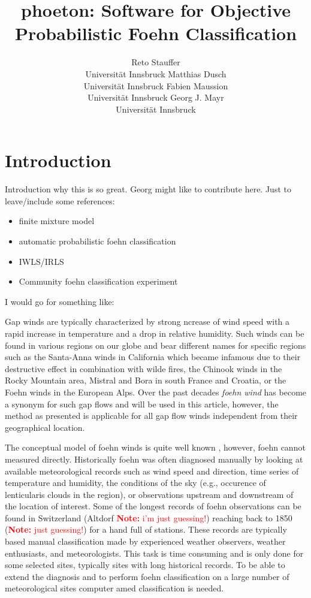 \documentclass[article,nojss,shortnames]{jss}
\author{Reto Stauffer\\Universit\"at Innsbruck
\And Matthias Dusch\\Universit\"at Innsbruck
\AND Fabien Maussion\\Universit\"at Innsbruck
\And Georg J. Mayr\\Universit\"at Innsbruck}
\title{phoeton: Software for Objective Probabilistic Foehn Classification}
\newcommand{\note}[1]{\textcolor{red}{\textbf{Note:} #1}}
\begin{document}
\section{Introduction}

Introduction why this is so great. Georg might like to contribute
here. Just to leave/include some references:
\begin{itemize}
    \item finite mixture model \citep{leisch2004,gruen2008}
    \item automatic probabilistic foehn classification \cite{plavcan2014}
    \item IWLS/IRLS \citep{mccullagh1989}
    \item Community foehn classification experiment \cite{mayr2018unpublished}
\end{itemize}

I would go for something like:

Gap winds are typically characterized by strong ncrease of wind speed with a rapid
increase in temperature and a drop in relative humidity. Such winds can be
found in various regions on our globe and bear different names for specific
regions such as the Santa-Anna winds in California which became infamous due to
their destructive effect in combination with wilde fires, the Chinook winds in
the Rocky Mountain area, Mistral and Bora in south France and Croatia, or the
Foehn winds in the European Alps.  Over the past decades \textit{foehn wind}
has become a synonym for such gap flows and will be used in this article,
however, the method as presented is applicable for all gap flow winds
independent from their geographical location.

The conceptual model of foehn winds is quite well known
\citep{armi2007,mayr2008,mayr2011}, however, foehn cannot measured directly.
Historically foehn was often diagnosed manually by looking at available
meteorological records such as wind speed and direction, time series of
temperature and humidity, the conditions of the sky (e.g., occurence of
lenticularis clouds in the region), or observations upstream and downstream of
the location of interest.  Some of the longest records of foehn observations
can be found in Switzerland (Altdorf \note{i'm just guessing!}) reaching back
to 1850 (\note{just guessing!}) for a hand full of stations.  These records are
typically based manual classification made by experienced weather observers,
weather enthusiasts, and meteorologists.  This task is time consuming and is
only done for some selected sites, typically sites with long historical
records. To be able to extend the diagnosis and to perform foehn classification
on a large number of meteorological sites computer amed classification is
needed.
\end{document}
